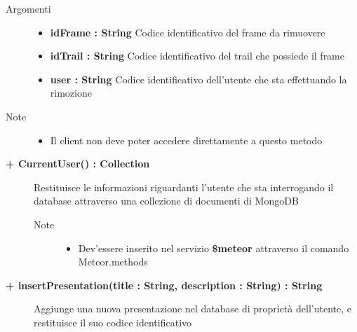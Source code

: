 \begin{description}
\begin{description}
		\begin{description}
			\item[Argomenti] \hfill
				\begin{itemize}
				
					\item \textbf{idFrame : String			} \hfill
					Codice identificativo del frame da rimuovere
					\item \textbf{idTrail : String			} \hfill
					Codice identificativo del trail che possiede il frame
					\item \textbf{user : String			} \hfill
					Codice identificativo dell'utente che sta effettuando la rimozione
					
				\end{itemize}
			\item[Note] \hfill
			\begin{itemize}
					\item Il client non deve poter accedere direttamente a questo metodo
				\end{itemize}
		\end{description}
	\end{description}

	\begin{description}
		\item[\textbf{\color{blue}+ CurrentUser() : Collection			}] \hfill
			Restituisce le informazioni riguardanti l'utente che sta interrogando il database attraverso una collezione di documenti di MongoDB
			
		\begin{description}
			
			\item[Note] \hfill
			\begin{itemize}
					\item Dev'essere inserito nel servizio \textbf{\$meteor} attraverso il comando Meteor.methods
				\end{itemize}
		\end{description}
	\end{description}

	\begin{description}
		\item[\textbf{\color{blue}+ insertPresentation(title : String, description : String) : String			}] \hfill
			Aggiunge una nuova presentazione nel database di proprietà dell'utente, e restituisce il suo codice identificativo
			

\end{description}
\end{description}
